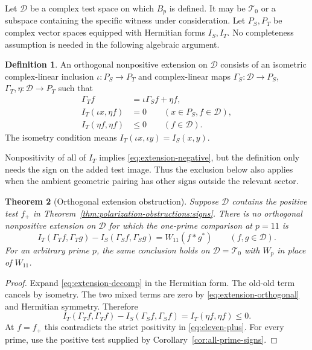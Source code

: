 \documentclass[11pt,letterpaper]{article}
\newtheorem{theorem}{Theorem}[section]
\theoremstyle{definition}
\newtheorem{definition}[theorem]{Definition}
\theoremstyle{remark}
\newcommand{\T}{\mathcal T}
\begin{document}
Let $\mathcal D$ be a complex test space on which $B_p$ is
defined. It may be $\T_0$ or a subspace containing the
specific witness under consideration. Let $P_S,P_T$ be
complex vector spaces equipped with Hermitian forms
$I_S,I_T$. No completeness assumption is needed in the
following algebraic argument.

\begin{definition}
\label{def:polarization-obstructions:extension}
An orthogonal nonpositive extension on $\mathcal D$ consists
of an isometric complex-linear inclusion
$\iota:P_S\to P_T$ and complex-linear maps
$\Gamma_S:\mathcal D\to P_S$,
$\Gamma_T,\eta:\mathcal D\to P_T$ such that
\begin{align}
 \Gamma_Tf&=\iota\Gamma_Sf+\eta f,
 \label{eq:extension-decomp}\\
 I_T(\iota x,\eta f)&=0\qquad(x\in P_S,f\in\mathcal D),
 \label{eq:extension-orthogonal}\\
 I_T(\eta f,\eta f)&\leq0\qquad(f\in\mathcal D).
 \label{eq:extension-negative}
\end{align}
The isometry condition means
$I_T(\iota x,\iota y)=I_S(x,y)$.
\end{definition}

Nonpositivity of all of $I_T$ implies
\eqref{eq:extension-negative}, but the definition only needs
the sign on the added test image. Thus the exclusion below
also applies when the ambient geometric pairing has other
signs outside the relevant sector.

\begin{theorem}[Orthogonal extension obstruction]
\label{thm:polarization-obstructions:extension}
Suppose $\mathcal D$ contains the positive test $f_+$ in
Theorem~\ref{thm:polarization-obstructions:signs}. There is
no orthogonal nonpositive extension on $\mathcal D$ for
which the one-prime comparison at $p=11$ is
\begin{equation}
 I_T(\Gamma_Tf,\Gamma_Tg)-I_S(\Gamma_Sf,\Gamma_Sg)
 =W_{11}(f*g^*)\qquad(f,g\in\mathcal D).
 \label{eq:target-increment}
\end{equation}
For an arbitrary prime $p$, the same conclusion holds on
$\mathcal D=\T_0$ with $W_p$ in place of $W_{11}$.
\end{theorem}
\begin{proof}
Expand \eqref{eq:extension-decomp} in the Hermitian form.
The old-old term cancels by isometry. The two mixed terms
are zero by \eqref{eq:extension-orthogonal} and Hermitian
symmetry. Therefore
\[
 I_T(\Gamma_Tf,\Gamma_Tf)-I_S(\Gamma_Sf,\Gamma_Sf)
 =I_T(\eta f,\eta f)\leq0.
\]
At $f=f_+$ this contradicts the strict positivity in
\eqref{eq:eleven-plus}. For every prime, use the positive
test supplied by Corollary~\ref{cor:all-prime-signs}.
\end{proof}
\end{document}
